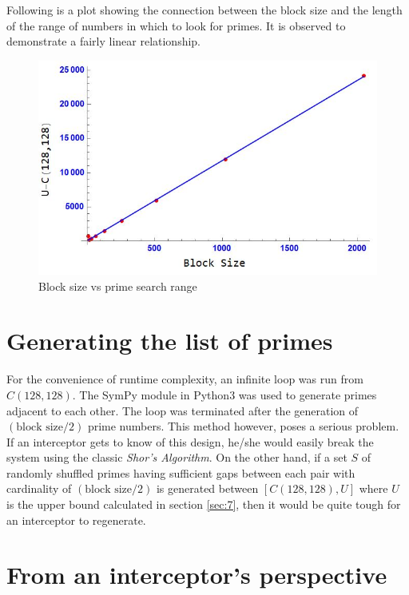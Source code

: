 \begin{flushleft}
Following is a plot showing the connection between the block size and the length of the range of numbers in which to look for primes. It is observed to demonstrate a fairly linear relationship.
\end{flushleft}
    \begin{figure}[hbt!]
    \centering
        \includegraphics[scale=0.45]{images/fig2.JPG}
        \caption{Block size vs prime search range}
        \label{fig:2}       %
    \end{figure}

\section{Generating the list of primes}
\label{sec:8}
For the convenience of runtime complexity, an infinite loop was run from $C(128,128)$. The SymPy module in Python3 was used to generate primes adjacent to each other. The loop was terminated after the generation of $(\text{block size}/2)$ prime numbers. This method however, poses a serious problem. If an interceptor gets to know of this design, he/she would easily break the system using the classic \textit{Shor's Algorithm}.
On the other hand, if a set $S$ of randomly shuffled primes having sufficient gaps between each pair with cardinality of $(\text{block size}/2)$ is generated between $[C(128,128),U]$ where $U$ is the upper bound calculated in section \ref{sec:7}, then it would be quite tough for an interceptor to regenerate.

\section{From an interceptor's perspective}
\label{sec:9}
